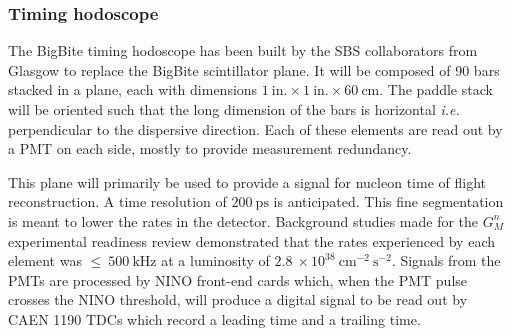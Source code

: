 \subsubsection{Timing hodoscope}

The BigBite timing hodoscope has been built by the SBS collaborators from Glasgow to replace the BigBite scintillator plane.
It will be composed of 90 bars stacked in a plane, each with dimensions $1~\mathrm{in.}\times1~\mathrm{in.}\times60~\mathrm{cm}$. The paddle stack will be oriented such that the long dimension of the bars is horizontal {\it i.e.} perpendicular to the dispersive direction.
Each of these elements are read out by a PMT on each side, mostly to provide measurement redundancy.

This plane will primarily be used to provide a signal for nucleon time of flight reconstruction. A time resolution of $200~\mathrm{ps}$ is anticipated.
This fine segmentation is meant to lower the rates in the detector. Background studies made for the $G_M^n$ experimental readiness review %
demonstrated that the rates experienced by each element was $\leq~500~\mathrm{kHz}$ at a luminosity of $2.8~\times10^{38}~\mathrm{cm}^{-2}~\mathrm{s}^{-2}$. %
Signals from the PMTs are processed by NINO front-end cards which, when the PMT pulse crosses the NINO threshold, will produce a digital signal to be read out by CAEN 1190 TDCs which record a leading time and a trailing time.

